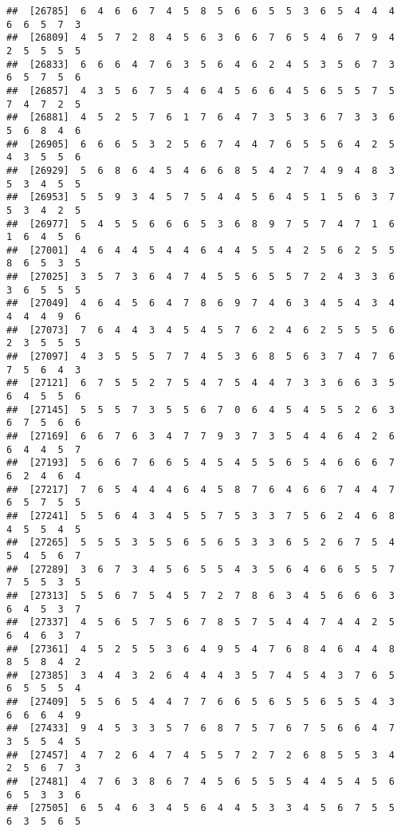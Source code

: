 \documentclass[
]{book}
\begin{document}
\begin{verbatim}
##  [26785]  6  4  6  6  7  4  5  8  5  6  6  5  5  3  6  5  4  4  4  6  6  5  7  3
##  [26809]  4  5  7  2  8  4  5  6  3  6  6  7  6  5  4  6  7  9  4  2  5  5  5  5
##  [26833]  6  6  6  4  7  6  3  5  6  4  6  2  4  5  3  5  6  7  3  6  5  7  5  6
##  [26857]  4  3  5  6  7  5  4  6  4  5  6  6  4  5  6  5  5  7  5  7  4  7  2  5
##  [26881]  4  5  2  5  7  6  1  7  6  4  7  3  5  3  6  7  3  3  6  5  6  8  4  6
##  [26905]  6  6  6  5  3  2  5  6  7  4  4  7  6  5  5  6  4  2  5  4  3  5  5  6
##  [26929]  5  6  8  6  4  5  4  6  6  8  5  4  2  7  4  9  4  8  3  5  3  4  5  5
##  [26953]  5  5  9  3  4  5  7  5  4  4  5  6  4  5  1  5  6  3  7  5  3  4  2  5
##  [26977]  5  4  5  5  6  6  6  5  3  6  8  9  7  5  7  4  7  1  6  1  6  4  5  6
##  [27001]  4  6  4  4  5  4  4  6  4  4  5  5  4  2  5  6  2  5  5  8  6  5  3  5
##  [27025]  3  5  7  3  6  4  7  4  5  5  6  5  5  7  2  4  3  3  6  3  6  5  5  5
##  [27049]  4  6  4  5  6  4  7  8  6  9  7  4  6  3  4  5  4  3  4  4  4  4  9  6
##  [27073]  7  6  4  4  3  4  5  4  5  7  6  2  4  6  2  5  5  5  6  2  3  5  5  5
##  [27097]  4  3  5  5  5  7  7  4  5  3  6  8  5  6  3  7  4  7  6  7  5  6  4  3
##  [27121]  6  7  5  5  2  7  5  4  7  5  4  4  7  3  3  6  6  3  5  6  4  5  5  6
##  [27145]  5  5  5  7  3  5  5  6  7  0  6  4  5  4  5  5  2  6  3  6  7  5  6  6
##  [27169]  6  6  7  6  3  4  7  7  9  3  7  3  5  4  4  6  4  2  6  6  4  4  5  7
##  [27193]  5  6  6  7  6  6  5  4  5  4  5  5  6  5  4  6  6  6  7  6  2  4  6  4
##  [27217]  7  6  5  4  4  4  6  4  5  8  7  6  4  6  6  7  4  4  7  6  5  7  5  5
##  [27241]  5  5  6  4  3  4  5  5  7  5  3  3  7  5  6  2  4  6  8  4  5  5  4  5
##  [27265]  5  5  5  3  5  5  6  5  6  5  3  3  6  5  2  6  7  5  4  5  4  5  6  7
##  [27289]  3  6  7  3  4  5  6  5  5  4  3  5  6  4  6  6  5  5  7  7  5  5  3  5
##  [27313]  5  5  6  7  5  4  5  7  2  7  8  6  3  4  5  6  6  6  3  6  4  5  3  7
##  [27337]  4  5  6  5  7  5  6  7  8  5  7  5  4  4  7  4  4  2  5  6  4  6  3  7
##  [27361]  4  5  2  5  5  3  6  4  9  5  4  7  6  8  4  6  4  4  8  8  5  8  4  2
##  [27385]  3  4  4  3  2  6  4  4  4  3  5  7  4  5  4  3  7  6  5  6  5  5  5  4
##  [27409]  5  5  6  5  4  4  7  7  6  6  5  6  5  5  6  5  5  4  3  6  6  6  4  9
##  [27433]  9  4  5  3  3  5  7  6  8  7  5  7  6  7  5  6  6  4  7  3  5  5  4  5
##  [27457]  4  7  2  6  4  7  4  5  5  7  2  7  2  6  8  5  5  3  4  2  5  6  7  3
##  [27481]  4  7  6  3  8  6  7  4  5  6  5  5  5  4  4  5  4  5  6  6  5  3  3  6
##  [27505]  6  5  4  6  3  4  5  6  4  4  5  3  3  4  5  6  7  5  5  6  3  5  6  5

\end{verbatim}
\end{document}
